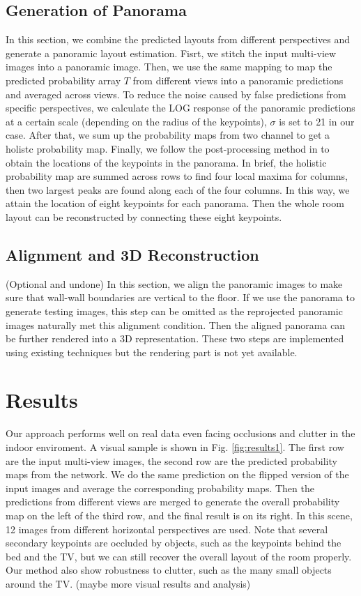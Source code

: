 \subsection{Generation of Panorama}
\label{sec:merging}
In this section, we combine the predicted layouts from different perspectives and generate a panoramic layout estimation. Fisrt, we stitch the input multi-view images into a panoramic image. Then, we use the same mapping to map the predicted probability array $T$ from different views into a panoramic predictions and averaged across views. To reduce the noise caused by false predictions from specific perspectives, we calculate the LOG response of the panoramic predictions at a certain scale (depending on the radius of the keypoints), $\sigma$ is set to 21 in our case. After that, we sum up the probability maps from two channel to get a holistc probability map. Finally, we follow the post-processing method in \cite{LayoutNet} to obtain the locations of the keypoints in the panorama. In brief, the holistic probability map are summed across rows to find four local maxima for columns, then two largest peaks are found along each of the four columns. In this way, we attain the location of eight keypoints for each panorama. Then the whole room layout can be reconstructed by connecting these eight keypoints. 


\subsection{Alignment and 3D Reconstruction}
\label{sec:align}

(Optional and undone) In this section, we align the panoramic images to make sure that wall-wall boundaries are vertical to the floor. If we use the panorama to generate testing images, this step can be omitted as the reprojected panoramic images naturally met this alignment condition. Then the aligned panorama can be further rendered into a 3D representation. These two steps are implemented using existing techniques but the rendering part is not yet available. 


\section{Results}
Our approach performs well on real data even facing occlusions and clutter in the indoor enviroment. A visual sample is shown in Fig. \ref{fig:results1}. The first row are the input multi-view images, the second row are the predicted probability maps from the network. We do the same prediction on the flipped version of the input images and average the corresponding probability maps. Then the predictions from different views are merged to generate the overall probability map on the left of the third row, and the final result is on its right. In this scene, 12 images from different horizontal perspectives are used. Note that several secondary keypoints are occluded by objects, such as the keypoints behind the bed and the TV, but we can still recover the overall layout of the room properly. Our method also show robustness to clutter, such as the many small objects around the TV. (maybe more visual results and analysis)

